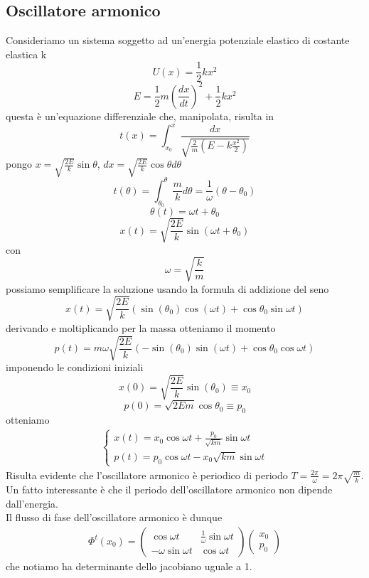 \documentclass[
10pt, %
a4paper, %
oneside, %
headinclude,footinclude, %
BCOR5mm, %
]{scrartcl}
\begin{document}
\subsection{Oscillatore armonico}
Consideriamo un sistema soggetto ad un'energia potenziale elastico di costante elastica k
\[U(x) = \frac{1}{2}kx^2\]
\[E = \frac{1}{2}m\left(\frac{dx}{dt}\right)^2 + \frac{1}{2}kx^2\]
questa è un'equazione differenziale che, manipolata, risulta in
\[t(x) = \int_{x_0}^x\frac{dx}{\sqrt{\frac{2}{m}\left(E-k\frac{x^2}{2}\right)}}\]
pongo \(x = \sqrt{\frac{2E}{k}}\sin\theta\), \(dx = \sqrt{\frac{2E}{k}}\cos\theta d\theta\)
\[t(\theta) = \int_{\theta_0}^{\theta}\frac{m}{k}d\theta= \frac{1}{\omega}(\theta-\theta_0)\]
\[\theta(t) = \omega t +\theta_0\]
\[x(t) =  \sqrt{\frac{2E}{k}}\sin(\omega t +\theta_0)\]
con
\[\omega = \sqrt{\frac{k}{m}}\]
possiamo semplificare la soluzione usando la formula di addizione del seno
\[x(t) = \sqrt{\frac{2E}{k}}\left(\sin(\theta_0)\cos(\omega t)+\cos\theta_0\sin\omega t\right)\]
derivando e moltiplicando per la massa otteniamo il momento
\[p(t) = m\omega\sqrt{\frac{2E}{k}}\left(-\sin(\theta_0)\sin(\omega t)+\cos\theta_0\cos\omega t\right)\]
imponendo le condizioni iniziali
\[x(0) = \sqrt{\frac{2E}{k}}\sin(\theta_0)\equiv x_0\]
\[p(0) = \sqrt{2Em}\cos\theta_0 \equiv p_0\]
otteniamo 
\begin{align*}
	\begin{cases}
		x(t) = x_0\cos\omega t+\frac{p_0}{\sqrt{km}}\sin\omega t\\
		p(t) = p_0\cos\omega t-x_0\sqrt{km}\sin\omega t
	\end{cases}
\end{align*}
Risulta evidente che l'oscillatore armonico è periodico di periodo \(T = \frac{2\pi}{\omega} = 2\pi\sqrt{\frac{m}{k}}\). Un fatto interessante è che il periodo dell'oscillatore armonico non dipende dall'energia.\\
Il flusso di fase dell'oscillatore armonico è dunque
\begin{align*}
	\Phi^t(x_0) = 
	\begin{pmatrix}
		\cos\omega t&\frac{1}{\omega}\sin\omega t\\
		-\omega\sin\omega t&\cos\omega t
	\end{pmatrix}
	\begin{pmatrix}
		x_0\\
		p_0
	\end{pmatrix}
\end{align*}
che notiamo ha determinante dello jacobiano uguale a 1.
\end{document}
